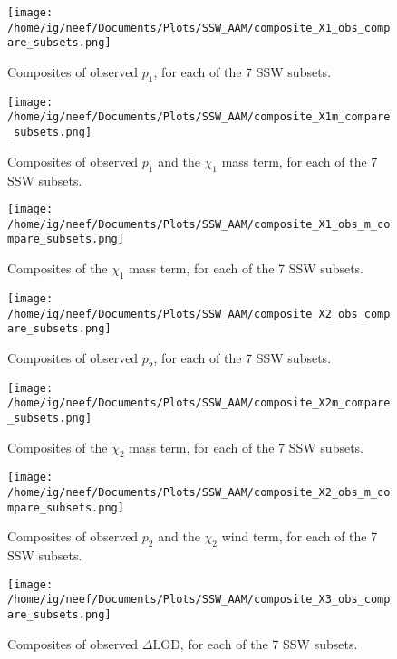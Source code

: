 \documentclass[11pt]{article}
\newcommand{\dlod}{{\Delta \text{LOD}}}
\begin{document}
\begin{figure}
  \noindent
  \texttt{[image: /home/ig/neef/Documents/Plots/SSW\_AAM/composite\_X1\_obs\_compare\_subsets.png]}
  \caption{Composites of observed $p_1$, for each of the 7 SSW subsets.}
   \label{fig:X1_obs_subsets}
 \end{figure}

\begin{figure}
  \noindent
  \texttt{[image: /home/ig/neef/Documents/Plots/SSW\_AAM/composite\_X1m\_compare\_subsets.png]}
  \caption{Composites of observed $p_1$ and the $\chi_1$ mass term, for each of the 7 SSW subsets.}
   \label{fig:X1_m_subsets}
 \end{figure}

\begin{figure}
  \noindent
  \texttt{[image: /home/ig/neef/Documents/Plots/SSW\_AAM/composite\_X1\_obs\_m\_compare\_subsets.png]}
  \caption{Composites of the $\chi_1$ mass term, for each of the 7 SSW subsets.}
   \label{fig:X1_obs_m_subsets}
 \end{figure}


\begin{figure}
  \noindent
  \texttt{[image: /home/ig/neef/Documents/Plots/SSW\_AAM/composite\_X2\_obs\_compare\_subsets.png]}
  \caption{Composites of observed $p_2$, for each of the 7 SSW subsets.}
   \label{fig:X2_obs_subsets}
 \end{figure}

\begin{figure}
  \noindent
  \texttt{[image: /home/ig/neef/Documents/Plots/SSW\_AAM/composite\_X2m\_compare\_subsets.png]}
  \caption{Composites of  the $\chi_2$ mass term, for each of the 7 SSW subsets.}
   \label{fig:X2_m_subsets}
 \end{figure}


\begin{figure}
  \noindent
  \texttt{[image: /home/ig/neef/Documents/Plots/SSW\_AAM/composite\_X2\_obs\_m\_compare\_subsets.png]}
  \caption{Composites of observed $p_2$ and the $\chi_2$ wind term, for each of the 7 SSW subsets.}
   \label{fig:X2_obs_m_subsets}
 \end{figure}


\begin{figure}
  \noindent
  \texttt{[image: /home/ig/neef/Documents/Plots/SSW\_AAM/composite\_X3\_obs\_compare\_subsets.png]}
  \caption{Composites of observed $\dlod$, for each of the 7 SSW subsets.}
   \label{fig:X3_obs_subsets}
 \end{figure}
\end{document}
